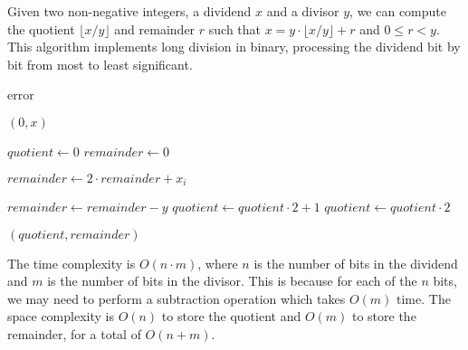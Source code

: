   \begin{algo}
    Given two non-negative integers, a dividend $x$ and a divisor $y$, we can compute the quotient $\lfloor x/y \rfloor$ and remainder $r$ such that $x = y \cdot \lfloor x/y \rfloor + r$ and $0 \leq r < y$. This algorithm implements long division in binary, processing the dividend bit by bit from most to least significant. 
    \begin{algorithmic}[1]  
       
         
          \State \Return error 
        \EndIf
        
         
          \State \Return $(0, x)$ 
        \EndIf
        
        \State $quotient \gets 0$ 
        \State $remainder \gets 0$ 
        
         
          \State $remainder \gets 2 \cdot remainder + x_i$ 
          
           
            \State $remainder \gets remainder - y$ 
            \State $quotient \gets quotient \cdot 2 + 1$ 
          \Else
            \State $quotient \gets quotient \cdot 2$ 
          \EndIf
        \EndFor
        
        \State \Return $(quotient, remainder)$ 
      \EndProcedure
    \end{algorithmic}
    The time complexity is $O(n \cdot m)$, where $n$ is the number of bits in the dividend and $m$ is the number of bits in the divisor. This is because for each of the $n$ bits, we may need to perform a subtraction operation which takes $O(m)$ time. The space complexity is $O(n)$ to store the quotient and $O(m)$ to store the remainder, for a total of $O(n + m)$.
  \end{algo}

